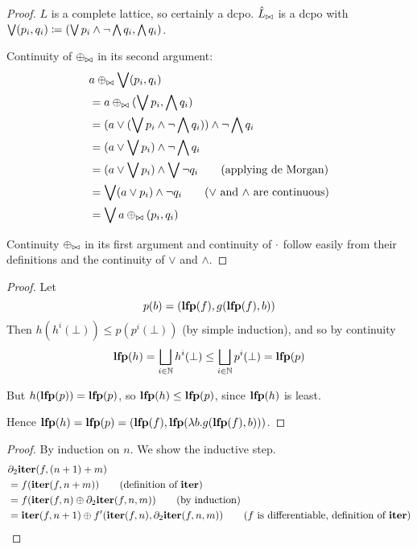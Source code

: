 \booleanAlgebraContinuous*
\begin{proof}
  \label{prf:booleanAlgebraContinuous}
  $L$ is a complete lattice, so certainly a dcpo. $\hat{L}_{\bowtie}$ is a
  dcpo with $\bigvee (p_i, q_i) \coloneqq (\bigvee p_i \wedge \neg \bigwedge q_i, \bigwedge q_i)$.

  Continuity of $\oplus_{\bowtie}$ in its second argument:
  \begin{align*}
    &a \oplus_{\bowtie} \bigvee (p_i, q_i)\\
    &= a \oplus_{\bowtie} (\bigvee p_i, \bigwedge q_i)\\
    &= (a \vee (\bigvee p_i \wedge \neg \bigwedge q_i)) \wedge \neg \bigwedge q_i\\
    &= (a \vee \bigvee p_i) \wedge \neg \bigwedge q_i\\
    &= (a \vee \bigvee p_i) \wedge \bigvee \neg q_i \tag{applying de Morgan}\\
    &= \bigvee (a \vee p_i) \wedge \neg q_i \tag{$\vee$ and $\wedge$ are continuous}\\
    &= \bigvee a \oplus_{\bowtie} (p_i, q_i)
  \end{align*}

  Continuity $\oplus_{\bowtie}$ in its first argument and continuity of $\cdot$ follow easily from their definitions and the continuity
  of $\vee$ and $\wedge$.
\end{proof}

\factoringFixpoints*
\begin{proof}
  \label{prf:factoringFixpoints}
  Let
  \begin{displaymath}
    p(b) = (\mathbf{lfp}(f), g(\mathbf{lfp}(f), b))
  \end{displaymath}
  Then $h(h^i(\bot)) \leq p(p^i(\bot))$ (by simple induction), and so by continuity
  \begin{displaymath}
    \mathbf{lfp}(h) = \bigsqcup_{i \in \mathbb{N}} h^i(\bot) \leq \bigsqcup_{i \in \mathbb{N}} p^i(\bot) = \mathbf{lfp}(p)
  \end{displaymath}

  But $h(\mathbf{lfp}(p)) = \mathbf{lfp}(p)$, so $\mathbf{lfp}(h) \leq \mathbf{lfp}(p)$, since $\mathbf{lfp}(h)$ is least.

  Hence $\mathbf{lfp}(h) = \mathbf{lfp}(p) = (\mathbf{lfp}(f), \mathbf{lfp}(\lambda b . g(\mathbf{lfp}(f), b)))$.
\end{proof}

\iterDerivativesN*
\begin{proof}
  \label{prf:iterDerivativesN}
  By induction on $n$. We show the inductive step.
  \begin{align*}
    &\partial_2\iter(f, (n+1) + m)\\
    &=f(\iter(f, n + m)) \tag{definition of $\iter$}\\
    &=f(\iter(f, n) \cplus \partial_2{\iter}(f, n, m)) \tag{by induction}\\
    &=\iter(f, n+1) \cplus \derive{f}(\iter(f, n), \partial_2{\iter}(f, n, m)) \tag{$f$ is differentiable, definition of $\iter$}
  \end{align*}
\end{proof}

